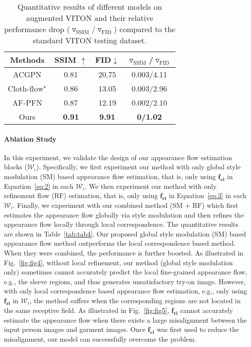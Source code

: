 \documentclass[10pt,twocolumn,letterpaper]{article}
\begin{document}
\begin{table}[t]
    \centering
    \begin{tabular}{c|c|c|c}
    \toprule
         Methods & SSIM $\uparrow$& FID$\downarrow$&$\triangledown_{\text{SSIM}}$/$\triangledown_{\text{FID}}$\\
         \midrule
         
         ACGPN &0.81&20.75&0.003/4.11\\
         $\text{Cloth-flow}^{\star}$\cite{han2019clothflow}&0.86& 13.05&0.003/2.96\\ 
         AF-PFN\cite{ge2021parser} &0.87 &12.19&0.002/2.10\\
         \midrule
         Ours&\textbf{0.91}& \textbf{9.91}&\textbf{0/1.02}\\
         \bottomrule
    \end{tabular}
    \caption{Quantitative results of different models on augmented VITON and their relative performance drop ($\triangledown_{\text{SSIM}}$/$\triangledown_{\text{FID}}$) compared to the standard VITON testing dataset.}
    \vspace{-0.4cm}
    \label{tab:tab3}
\end{table}

\paragraph{Ablation Study} In this experiment, we validate the design of our appearance flow estimation blocks ($\mathcal{W}_{i}$). Specifically, we first experiment our method with only global style modulation (SM) based appearance flow estimation, that is, only using $\mathbf{f_{ci}}$ in Equation~\ref{eq:2} in each $\mathcal{W}_{i}$. We then experiment our method with only refinement flow (RF) estimation, that is, only using $\mathbf{f_{ri}}$ in Equation~\ref{eq:3} in each $\mathcal{W}_{i}$. Finally, we experiment with our combined method (SM + RF) which first estimates the appearance flow globally via style modulation and then refines the appearance flow locally through local correspondence. The quantitative results are shown in Table~\ref{tab:tab4}. Our proposed global style modulation (SM) based appearance flow method outperforms the local correspondence based method. When they were combined, the performance is further boosted. As illustrated in Fig.~\ref{fig:fig4}, without local refinement, our method (global style modulation only) sometimes cannot accurately predict the local fine-grained appearance flow, e.g., the sleeve regions, and thus generates unsatisfactory try-on image. However, with only local correspondence based appearance flow estimation, e.g., only using $\mathbf{f_{ri}}$ in $\mathcal{W}_{i}$, the method suffers when the corresponding regions are not located in the same receptive field. As illustrated in Fig.~\ref{fig:fig5}, $\mathbf{f_{ri}}$ cannot accurately estimate the appearance flow when there exists a large misalignment between the input person images and garment images. Once $\mathbf{f_{ci}}$ was first used to reduce the misalignment, our model can successfully overcome the problem. 
\end{document}
